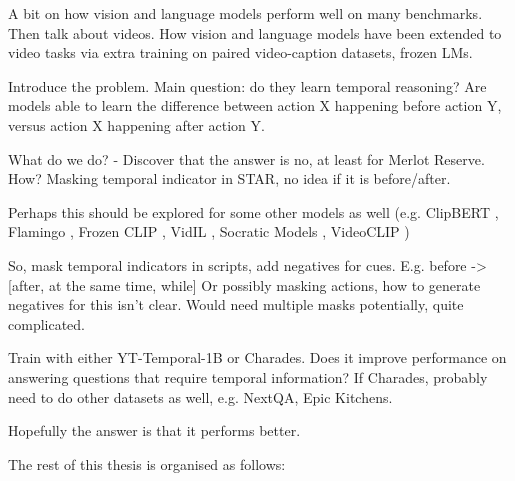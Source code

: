 
A bit on how vision and language models perform well on many benchmarks. Then
talk about videos. How vision and language models have been extended to video
tasks via extra training on paired video-caption datasets, frozen LMs.

Introduce the problem. Main question: do they learn temporal reasoning? Are
models able to learn the difference between action X happening before action Y,
versus action X happening after action Y.

What do we do? - Discover that the answer is no, at least for Merlot Reserve.
How? Masking temporal indicator in STAR, no idea if it is before/after.

Perhaps this should be explored for some other models as well (e.g. ClipBERT
\cite{lei2021clipbert}, Flamingo \cite{alayrac2022flamingo}, Frozen CLIP
\cite{lin2022evl}, VidIL \cite{wang2022vidil}, Socratic Models
\cite{zeng2023socratic}, VideoCLIP \cite{xu2021videoclip})

So, mask temporal indicators in scripts, add negatives for cues.
E.g. before -\textgreater [after, at the same time, while]
Or possibly masking actions, how to generate negatives for this isn't clear.
Would need multiple masks potentially, quite complicated.

Train with either YT-Temporal-1B or Charades. Does it improve performance on
answering questions that require temporal information? If Charades, probably
need to do other datasets as well, e.g. NextQA, Epic Kitchens.

Hopefully the answer is that it performs better.

The rest of this thesis is organised as follows:

